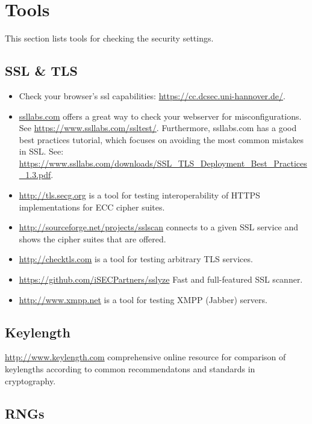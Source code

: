 \section{Tools}
\label{section:Tools}
This section lists tools for checking the security settings.

\subsection{SSL \& TLS}

\begin{itemize}
\item Check your browser's ssl capabilities: \url{https://cc.dcsec.uni-hannover.de/}.
\item \href{http://ssllabs.com}{ssllabs.com} offers a great way to check your webserver for misconfigurations. See \url{https://www.ssllabs.com/ssltest/}.
Furthermore, ssllabs.com has a good best practices tutorial, which focuses on avoiding the most common mistakes in SSL.
See: \url{https://www.ssllabs.com/downloads/SSL_TLS_Deployment_Best_Practices_1.3.pdf}.
\item \url{http://tls.secg.org} is a tool for testing interoperability of HTTPS implementations for ECC cipher suites.
\item \url{http://sourceforge.net/projects/sslscan} connects to a given SSL service and shows the cipher suites that are offered.
\item \url{http://checktls.com} is a tool for testing arbitrary TLS services. 
\item \url{https://github.com/iSECPartners/sslyze} Fast and full-featured SSL scanner.
\item \url{http://www.xmpp.net} is a tool for testing XMPP (Jabber) servers.
\end{itemize}

\subsection{Keylength}

\url{http://www.keylength.com} comprehensive online resource for comparison of keylengths according to common recommendatons and standards in cryptography.

\subsection{RNGs}

